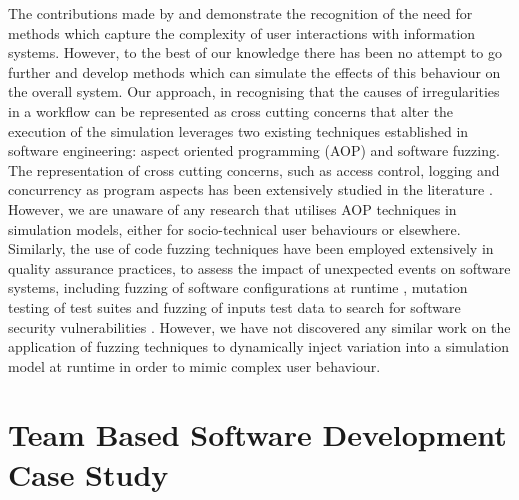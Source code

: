 \documentclass{llncs}
\begin{document}
The contributions made by \citet{herrmann1999vagueness} and \citet{sommerville09deriving} demonstrate the recognition of
the need for methods which capture the complexity of user interactions with information systems.  However, to the best
of our knowledge there has been no attempt to go further and develop methods which can simulate the effects of this
behaviour on the overall system.  Our approach, in recognising that the causes of irregularities in a workflow can be represented as cross
cutting concerns that alter the execution of the simulation leverages two existing techniques established in software 
engineering: aspect oriented programming (AOP) and software fuzzing. The representation of cross cutting concerns, such 
as access control, logging and concurrency
as program aspects has been extensively studied in the literature \citep{Ali2012Aspect}.  However, we are
unaware of any research that utilises AOP techniques in simulation models, either for
socio-technical user behaviours or elsewhere.  Similarly, the use of code fuzzing techniques have been employed
extensively in quality assurance practices, to assess the impact of unexpected events on software systems,
including fuzzing of software configurations at runtime \citep{config_fuzzing}, mutation testing of test suites \cite{demillo78hints}
and fuzzing of inputs test data to search for software security vulnerabilities \citep{takanen08fuzzing}.  However, we
have not discovered any similar work on the application of fuzzing techniques to dynamically inject variation into a
simulation model at runtime in order to mimic complex user behaviour.


\section{Team Based Software Development Case Study}
\label{sec:case-study}

\end{document}

